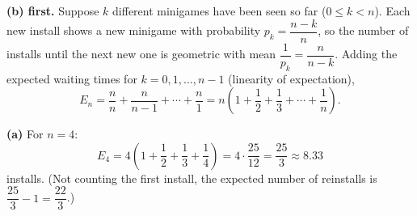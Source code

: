 \textbf{(b) first.} Suppose $k$ different minigames have been seen so far ($0\le k<n$). Each new install shows a new minigame with probability $p_k=\dfrac{n-k}{n}$, so the number of installs until the next new one is geometric with mean $\dfrac{1}{p_k}=\dfrac{n}{n-k}$. Adding the expected waiting times for $k=0,1,\dots,n-1$ (linearity of expectation),
\[
E_n=\dfrac {n}{n}+\dfrac {n}{n-1}+\cdots+\dfrac {n}{1}=n\left(1+\dfrac{1}{2}+\dfrac{1}{3}+\cdots+\dfrac{1}{n}\right).
\]

\textbf{(a)} For $n=4$:
\[
E_4=4\left(1+\dfrac{1}{2}+\dfrac{1}{3}+\dfrac{1}{4}\right)=4\cdot\dfrac{25}{12}=\boxed{\dfrac{25}{3}}\approx8.33
\]
installs. (Not counting the first install, the expected number of reinstalls is $\dfrac{25}{3}-1=\dfrac{22}{3}$.)
